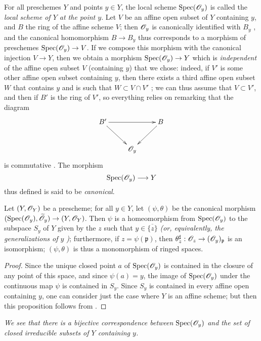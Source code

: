 For all preschemes $Y$ and points $y\in Y$, the local scheme $\operatorname{Spec}(\mathscr{O}_y)$
is called the \emph{local scheme of $Y$ at the point $y$}.
Let $V$ be an affine open subset of $Y$ containing $y$, and $B$ the ring of the affine scheme $V$;
then $\mathscr{O}_y$ is canonically identified with $B_y$ , and the canonical homomorphism $B\to B_y$ thus corresponds  to a morphism of preschemes $\Spec(\sh{O}_y)\to V$.
If we compose this morphism with the canonical injection $V\to Y$, then we obtain a morphism $\Spec(\sh{O}_y)\to Y$ which is \emph{independent} of the affine open subset $V$ (containing $y$) that we chose: indeed, if $V'$ is some other affine open subset containing $y$, then there exists a third affine open subset $W$ that contains $y$ and is such that $W\subset V\cap V'$ ;
we can thus assume that $V\subset V'$, and then if $B'$ is the ring of $V'$, so everything relies on remarking that the diagram
\[
  \xymatrix{
    B'\ar[rr]\ar[dr] & &
    B\ar[dl]\\
    & \sh{O}_y
  }
\]
is commutative .
The morphism
\[
  \Spec(\sh{O}_y)\to Y
\]
thus defined is said to be {\it canonical}.

\begin{proposition}[2.4.2]
\label{I.2.4.2}
Let $(Y,\mathscr{O}_Y)$ be a prescheme;
for all $y\in Y$, let $(\psi,\theta)$ be the canonical morphism $(\Spec(\sh{O}_y),\widetilde{\sh{O}}_y)\to(Y,\sh{O}_Y)$.
Then $\psi$ is a homeomorphism from $\operatorname{Spec}(\mathscr{O}_y)$ to the subspace $S_y$ of $Y$ given by the $z$ such that $y\in\overline{\{z\}}$ \emph{(or, equivalently, the \emph{generalizations} of $y$ )};
furthermore, if $z=\psi(\mathfrak{p})$, then $\theta_z^\sharp:\sh{O}_z\to(\sh{O}_y)_\mathfrak{p}$ is an isomorphism;
$(\psi,\theta)$ is thus a monomorphism of ringed spaces.
\end{proposition}

\begin{proof}
Since the unique closed point $a$ of $\operatorname{Spec}(\mathscr{O}_y)$ is contained in the closure of any point of this space, and since $\psi(a)=y$, the image of $\operatorname{Spec}(\mathscr{O}_y)$ under the continuous map $\psi$ is contained in $S_y$.
Since $S_y$ is contained in every affine open containing $y$, one can consider just the case where $Y$ is an affine scheme;
but then this proposition follows from .
\end{proof}

\emph{We see  that there is a bijective correspondence between $\operatorname{Spec}(\mathscr{O}_y)$ and the set of closed irreducible subsets of $Y$ containing $y$.}

